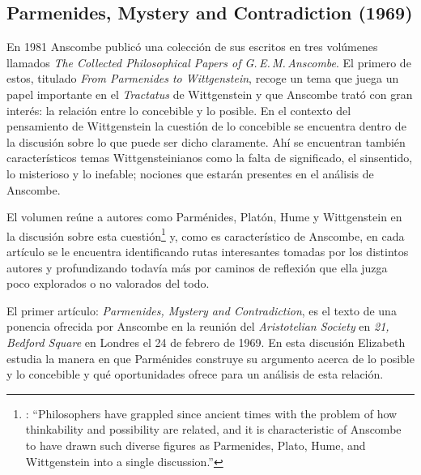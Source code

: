 \subsection{Parmenides, Mystery and Contradiction (1969)}

En 1981 Anscombe publicó una colección de sus escritos en tres volúmenes llamados \emph{The Collected Philosophical Papers of G.\,E.\,M.\,Anscombe}. El primero de estos, titulado \emph{From Parmenides to Wittgenstein}, recoge un tema que juega un papel importante en el \emph{Tractatus} de Wittgenstein y que Anscombe trató con gran interés: la relación entre lo concebible y lo posible. En el contexto del pensamiento de Wittgenstein la cuestión de lo concebible se encuentra dentro de la discusión sobre lo que puede ser dicho claramente. Ahí se encuentran también característicos temas Wittgensteinianos como la falta de significado, el sinsentido, lo misterioso y lo inefable; nociones que estarán presentes en el análisis de Anscombe.

El volumen reúne a autores como Parménides, Platón, Hume y Wittgenstein en la discusión sobre esta cuestión\footnote{\cite[Cf.~][193]{teichmann2008ans}: \enquote{Philosophers have grappled since ancient times with the problem of how thinkability and possibility are related, and it is characteristic of Anscombe to have drawn such diverse figures as Parmenides, Plato, Hume, and Wittgenstein into a single discussion.}} y, como es característico de Anscombe, en cada artículo se le encuentra identificando rutas interesantes tomadas por los distintos autores y profundizando todavía más por caminos de reflexión que ella juzga poco explorados o no valorados del todo.

El primer artículo: \emph{Parmenides, Mystery and Contradiction}, es el texto de una ponencia ofrecida por Anscombe en la reunión del \emph{Aristotelian Society} en \emph{21, Bedford Square} en Londres el 24 de febrero de 1969. En esta discusión Elizabeth estudia la manera en que Parménides construye su argumento acerca de lo posible y lo concebible y qué oportunidades ofrece para un análisis de esta relación.

